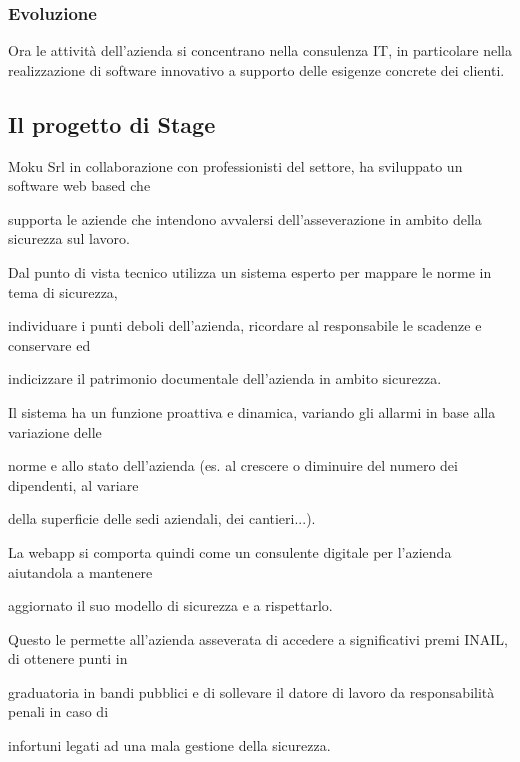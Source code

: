 \subsubsection{Evoluzione}
Ora le attività dell'azienda si concentrano nella consulenza IT, in particolare nella realizzazione di software innovativo a supporto delle esigenze concrete dei clienti.
\subsection{Il progetto di Stage}
Moku	Srl	in	collaborazione	con	professionisti	del	settore,	ha	sviluppato	un	software	web	based che	

supporta	le	aziende	che	intendono	avvalersi	dell’asseverazione	in	ambito	della	sicurezza	sul	lavoro.	

Dal	 punto	 di	 vista	 tecnico	 utilizza	 un	 sistema	 esperto	 per	mappare	 le	 norme	 in	 tema	 di	 sicurezza,	

individuare	 i	 punti	 deboli	 dell’azienda,	 ricordare	 al	 responsabile	 le	 scadenze	 e	 conservare	 ed	

indicizzare	il	patrimonio	documentale	dell’azienda	in	ambito	sicurezza.

Il	 sistema	 ha	 un	 funzione	 proattiva	 e	 dinamica,	 variando	 gli	 allarmi	 in	 base	 alla	 variazione	 delle	

norme	 e	 allo	 stato	 dell’azienda	 (es.	 al	 crescere	 o	 diminuire	 del	 numero	 dei	 dipendenti,	 al	 variare	

della	 superficie	 delle	 sedi	 aziendali,	 dei	 cantieri...).

La	 webapp	 si	 comporta	 quindi	 come	 un	 consulente	 digitale	 per	 l’azienda	 aiutandola	 a	 mantenere	

aggiornato	il	suo	modello	di	sicurezza	e	a	rispettarlo.

Questo	le	permette	all’azienda	asseverata	di	accedere	a	significativi	premi	INAIL,	di	ottenere	punti	in	

graduatoria	 in	 bandi	 pubblici	 e	 di	 sollevare	 il	 datore	 di	 lavoro	 da	 responsabilità	 penali	 in	 caso	 di	

infortuni	legati	ad	una	mala	gestione	della	sicurezza.